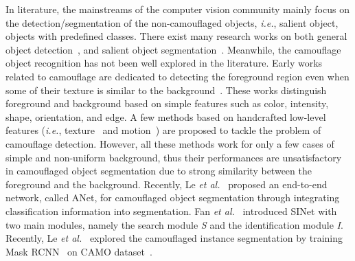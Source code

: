\documentclass[journal]{IEEEtran}
\begin{document}
In literature, the mainstreams of the computer vision community mainly focus on the detection/segmentation of the non-camouflaged objects, \textit{i.e.}, salient object, objects with predefined classes. There exist many  research works on both general object detection~\cite{Girshick-CVPR2014, fast, Ren-NIPS2015, ltnghia-IV2020}, and salient object segmentation~\cite{Wang-ICCV2017, egnet, cpd, pfanet, basnet,  ltnghia-WACV2019, AH, ltnghia-PSIVT2015, SP, ltnghia-BMVC2017, ltnghia-TIP2018}. Meanwhile, the camouflage object recognition has not been  well explored in the literature. Early works related to camouflage are dedicated to detecting the foreground region even when some of their texture is similar to the background~\cite{Galun-ICCV2003, Song-ICMT2010, Xue-MTA2016}. These works distinguish foreground and background based on simple features such as color, intensity, shape, orientation, and edge. A few methods based on handcrafted low-level features (\textit{i.e.}, texture~\cite{Pan-MAS2011, Liu-TIP2012, Sengottuvelan-ICETET2008} and motion~\cite{Yin-PE2011, Gallego-ICIP2014}) are proposed to tackle the problem of camouflage detection. However, all these methods work for only a few cases of simple and non-uniform background, thus their performances are unsatisfactory in camouflaged object segmentation due to strong similarity between the foreground and the background. Recently, Le \textit{et al.}~\cite{CAMO} proposed an end-to-end network, called ANet, for camouflaged object segmentation through integrating classification information into segmentation. Fan \textit{et al.}~\cite{sinet} introduced SINet with two main modules, namely the search module \textit{S} and the identification module \textit{I}. Recently, Le \textit{et al.}~\cite{camo_aaai} explored the camouflaged instance segmentation by training Mask RCNN~\cite{Kaiming-ICCV2017} on CAMO dataset~\cite{CAMO}. 
\end{document}
